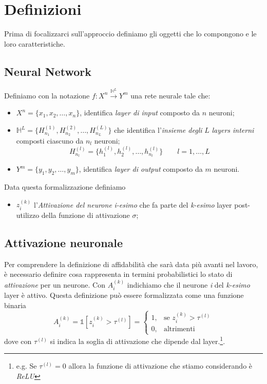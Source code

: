 \documentclass[10pt]{article} %
\begin{document}
\section{Definizioni}
\label{assunzioni}
Prima di focalizzarci sull'approccio definiamo gli oggetti che lo compongono e le loro caratteristiche.

\subsection{Neural Network}
\label{A1-FeedForward}
Definiamo con la notazione $f: X^{n} \xrightarrow{\mathbb{H}^{L}} Y^{m}$ una rete neurale tale che:
\begin{itemize}
    \item $X^{n} = \{x_{1}, x_{2}, \dots, x_{n}\}$, identifica \textit{layer di input} composto da $n$ neuroni;
    \item $\mathbb{H}^{L} = \{H^{(1)}_{n_{1}}, H^{(2)}_{n_{2}}, \dots, H^{(L)}_{n_{L}}\}$ che identifica l'\textit{insieme degli} $L$ \textit{layers interni} composti ciascuno da $n_{l}$ neuroni;
    \begin{equation}
        H^{(l)}_{n_{l}} = \{h^{(l)}_{1}, h^{(l)}_{2}, \dots, h^{(l)}_{n_{l}}\}\qquad l = 1, \dots, L
    \end{equation}
    \item $Y^{m} = \{y_{1}, y_{2}, \dots, y_{m}\}$, identifica \textit{layer di output} composto da $m$ neuroni.
\end{itemize}
Data questa formalizzazione definiamo
\begin{itemize}
    \item $z^{(k)}_{i}$ l'\textit{Attivazione del neurone} \textit{i-esimo} che fa parte del \textit{k-esimo} layer post-utilizzo della funzione di attivazione $\sigma$;
\end{itemize}

\subsection{Attivazione neuronale}
\label{A2-Attivazione}
Per comprendere la definizione di affidabilità che sarà data più avanti nel lavoro, è necessario definire cosa rappresenta in termini probabilistici lo stato di \textit{attivazione} per un neurone. Con $A^{(k)}_{i}$ indichiamo che il neurone \textit{i} del \textit{k-esimo} layer è attivo. Questa definizione può essere formalizzata come una funzione binaria
\begin{equation}
    A^{(k)}_{i} = \mathbb{1}[z^{(k)}_{i} > \tau^{(l)}] = 
    \begin{cases} 
        1, & \mbox{se }z^{(k)}_{i} > \tau^{(l)} \\ 
        0, & \mbox{altrimenti}
    \end{cases}
\end{equation}
dove con $\tau^{(l)}$ si indica la soglia di attivazione che dipende dal layer.\footnote{e.g. Se $\tau^{(l)} = 0$ allora la funzione di attivazione che stiamo considerando è \textit{ReLU}}.
\end{document}

